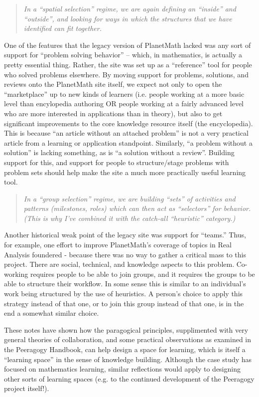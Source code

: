 \begin{quote}
\emph{In a ``spatial selection'' regime, we are again defining an
``inside'' and ``outside'', and looking for ways in which the structures
that we have identified can fit together.}
\end{quote}
One of the features that the legacy version of PlanetMath lacked was any
sort of support for ``problem solving behavior'' -- which, in
mathematics, is actually a pretty essential thing. Rather, the site was
set up as a ``reference'' tool for people who solved problems elsewhere.
By moving support for problems, solutions, and reviews onto the
PlanetMath site itself, we expect not only to open the ``marketplace''
up to new kinds of learners (i.e. people working at a more basic level
than encylopedia authoring OR people working at a fairly advanced level
who are more interested in applications than in theory), but also to get
significant improvements to the core knowledge resource itself (the
encyclopedia). This is because ``an article without an attached
problem'' is not a very practical article from a learning or application
standpoint. Similarly, ``a problem without a solution'' is lacking
something, as is ``a solution without a review''. Building support for
this, and support for people to structure/stage problems with problem
sets should help make the site a much more practically useful learning
tool.

\begin{quote}
\emph{In a ``group selection'' regime, we are building ``sets'' of
activities and patterns (milestones, roles) which can then act as
``selectors'' for behavior. (This is why I've combined it with the
catch-all ``heuristic'' category.)}
\end{quote}
Another historical weak point of the legacy site was support for
``teams.'' Thus, for example, one effort to improve PlanetMath's
coverage of topics in Real Analysis foundered - because there was no way
to gather a critical mass to this project. There are social, technical,
and knowledge aspects to this problem. Co-working requires people to be
able to join groups, and it requires the groups to be able to structure
their workflow. In some sense this is similar to an individual's work
being structured by the use of heuristics. A person's choice to apply
this strategy instead of that one, or to join this group instead of that
one, is in the end a somewhat similar choice.

These notes have shown how the paragogical principles, supplimented with
very general theories of collaboration, and some practical observations
as examined in the Peeragogy Handbook, can help design a space for
learning, which is itself a ``learning space'' in the sense of knowledge
building. Although the case study has focused on mathematics learning,
similar reflections would apply to designing other sorts of learning
spaces (e.g. to the continued development of the Peeragogy project
itself!).
